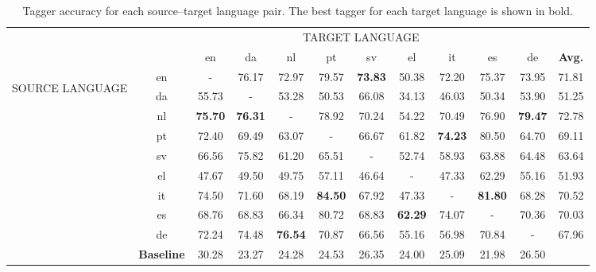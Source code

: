 \begin{table}
\centering
\setlength{\tabcolsep}{3pt}
    \begin{tabular}{rccccccccccc}

          & \multicolumn{11}{c}{TARGET LANGUAGE} \\
          &       & en    & da    & nl    & pt    & sv    & el    & it    & es    & de    & \textbf{Avg.} \\
    \multicolumn{1}{c}{\multirow{10}[0]{*}{
	\begin{sideways}  
    SOURCE LANGUAGE
    \end{sideways}
}} & en    & -     & 76.17 & 72.97 & 79.57 & \textbf{73.83} & 50.38 & 72.20 & 75.37 & 73.95 & 71.81 \\
    \multicolumn{1}{c}{} & da    & 55.73 & -     & 53.28 & 50.53 & 66.08 & 34.13 & 46.03 & 50.34 & 53.90 & 51.25 \\
    \multicolumn{1}{c}{} & nl    & \textbf{75.70} & \textbf{76.31} & -     & 78.92 & 70.24 & 54.22 & 70.49 & 76.90 & \textbf{79.47} & 72.78 \\
    \multicolumn{1}{c}{} & pt    & 72.40 & 69.49 & 63.07 & -     & 66.67 & 61.82 & \textbf{74.23} & 80.50 & 64.70 & 69.11 \\
    \multicolumn{1}{c}{} & sv    & 66.56 & 75.82 & 61.20 & 65.51 & -     & 52.74 & 58.93 & 63.88 & 64.48 & 63.64 \\
    \multicolumn{1}{c}{} & el    & 47.67 & 49.50 & 49.75 & 57.11 & 46.64 & -     & 47.33 & 62.29 & 55.16 & 51.93 \\
    \multicolumn{1}{c}{} & it    & 74.50 & 71.60 & 68.19 & \textbf{84.50} & 67.92 & 47.33 & -     & \textbf{81.80} & 68.28 & 70.52 \\
    \multicolumn{1}{c}{} & es    & 68.76 & 68.83 & 66.34 & 80.72 & 68.83 & \textbf{62.29} & 74.07 & -     & 70.36 & 70.03 \\
    \multicolumn{1}{c}{} & de    & 72.24 & 74.48 & \textbf{76.54} & 70.87 & 66.56 & 55.16 & 56.98 & 70.84 & -     & 67.96 \\
    \multicolumn{1}{c}{} & \textbf{Baseline} & 30.28 & 23.27 & 24.28 & 24.53 & 26.35 & 24.00 & 25.09 & 21.98 & 26.50 &  \\
    \end{tabular}%


\caption{Tagger accuracy for each source--target language pair. The best tagger for each target language is shown in bold.}
\label{fig:taggerPerformance}
\end{table}

